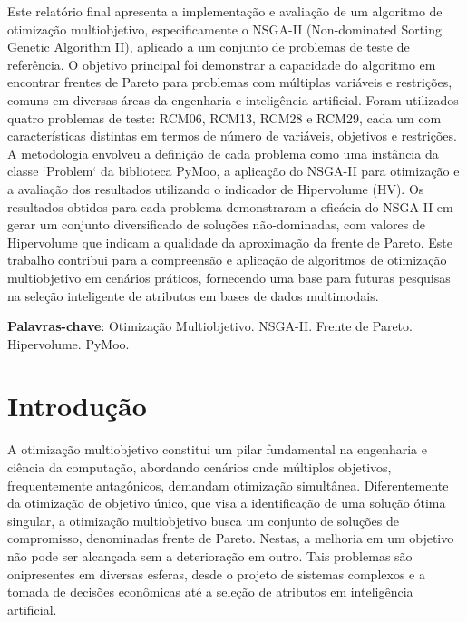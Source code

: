 \documentclass[12pt,openright,oneside,a4paper,english,brazil]{abntex2}
\begin{document}
\imprimirfolhaderosto

\begin{resumo}
Este relatório final apresenta a implementação e avaliação de um algoritmo de otimização multiobjetivo, especificamente o NSGA-II (Non-dominated Sorting Genetic Algorithm II), aplicado a um conjunto de problemas de teste de referência. O objetivo principal foi demonstrar a capacidade do algoritmo em encontrar frentes de Pareto para problemas com múltiplas variáveis e restrições, comuns em diversas áreas da engenharia e inteligência artificial. Foram utilizados quatro problemas de teste: RCM06, RCM13, RCM28 e RCM29, cada um com características distintas em termos de número de variáveis, objetivos e restrições. A metodologia envolveu a definição de cada problema como uma instância da classe `Problem` da biblioteca PyMoo, a aplicação do NSGA-II para otimização e a avaliação dos resultados utilizando o indicador de Hipervolume (HV). Os resultados obtidos para cada problema demonstraram a eficácia do NSGA-II em gerar um conjunto diversificado de soluções não-dominadas, com valores de Hipervolume que indicam a qualidade da aproximação da frente de Pareto. Este trabalho contribui para a compreensão e aplicação de algoritmos de otimização multiobjetivo em cenários práticos, fornecendo uma base para futuras pesquisas na seleção inteligente de atributos em bases de dados multimodais.

\textbf{Palavras-chave}: Otimização Multiobjetivo. NSGA-II. Frente de Pareto. Hipervolume. PyMoo.
\end{resumo}

\tableofcontents*
\cleardoublepage

\chapter{Introdução}
A otimização multiobjetivo constitui um pilar fundamental na engenharia e ciência da computação, abordando cenários onde múltiplos objetivos, frequentemente antagônicos, demandam otimização simultânea. Diferentemente da otimização de objetivo único, que visa a identificação de uma solução ótima singular, a otimização multiobjetivo busca um conjunto de soluções de compromisso, denominadas frente de Pareto. Nestas, a melhoria em um objetivo não pode ser alcançada sem a deterioração em outro. Tais problemas são onipresentes em diversas esferas, desde o projeto de sistemas complexos e a tomada de decisões econômicas até a seleção de atributos em inteligência artificial.
\end{document}

